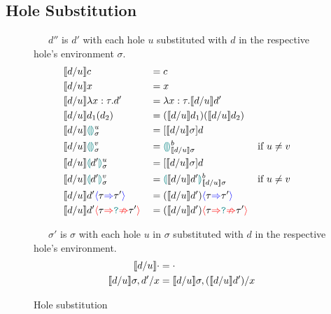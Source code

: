 \subsection{Hole Substitution}
\begin{figure}[H]
\ \ \ $d''$ is $d'$ with each hole $u$ substituted with $d$ in the respective hole's environment $\sigma$.
\begin{align*}
&\contextualsub c &&= c\\
&\contextualsub x &&= x\\
&\contextualsub \lambda x:\tau.d' &&= \lambda x:\tau. \contextualsub d'\\
&\contextualsub d_1(d_2) &&= (\contextualsub d_1)(\contextualsub d_2)\\
&\contextualsub \hole^u_\sigma &&= [\contextualsub  \sigma]d\\
&\contextualsub \hole^v_\sigma &&= \hole^b_{\contextualsub \sigma} && \text{if $u \neq v$}\\
&\contextualsub \hole[d']^u_\sigma &&= [\contextualsub  \sigma]d\\
&\contextualsub \hole[d']^v_\sigma &&= \hole[\contextualsub d']^b_{\contextualsub \sigma} && \text{if $u \neq v$}\\
&\contextualsub d'\scast{\tau}{\tau'} &&= (\contextualsub d')\scast{\tau}{\tau'}\\
&\contextualsub d'\scasterror{\tau}{\tau'} &&= (\contextualsub d')\scasterror{\tau}{\tau'}\\
\end{align*}

\ \ \ $\sigma'$ is $\sigma$ with each hole $u$ in $\sigma$ substituted with $d$ in the respective hole's environment.
\begin{align*}
\contextualsub \cdot &= \cdot\\ 
\contextualsub \sigma, d'/x &= \contextualsub \sigma, (\contextualsub d')/x
\end{align*}
\caption{Hole substitution}
\label{fig:holesubstitution}
\end{figure} 

